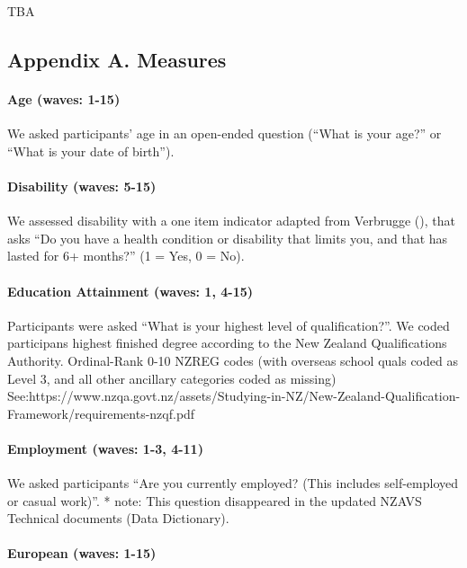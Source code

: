 \documentclass[
  singlecolumn,
  9pt]{article}
\let\oldparagraph\paragraph
\renewcommand{\paragraph}[1]{\oldparagraph{#1}\mbox{}}
\begin{document}
TBA

\newpage{}

\subsection{Appendix A. Measures}\label{appendix-a.-measures}

\paragraph{Age (waves: 1-15)}\label{age-waves-1-15}

We asked participants' age in an open-ended question (``What is your
age?'' or ``What is your date of birth'').

\paragraph{Disability (waves: 5-15)}\label{disability-waves-5-15}

We assessed disability with a one item indicator adapted from Verbrugge
(), that asks ``Do you have a health
condition or disability that limits you, and that has lasted for 6+
months?'' (1 = Yes, 0 = No).

\paragraph{Education Attainment (waves: 1,
4-15)}\label{education-attainment-waves-1-4-15}

Participants were asked ``What is your highest level of
qualification?''. We coded participans highest finished degree according
to the New Zealand Qualifications Authority. Ordinal-Rank 0-10 NZREG
codes (with overseas school quals coded as Level 3, and all other
ancillary categories coded as missing)
See:https://www.nzqa.govt.nz/assets/Studying-in-NZ/New-Zealand-Qualification-Framework/requirements-nzqf.pdf

\paragraph{Employment (waves: 1-3,
4-11)}\label{employment-waves-1-3-4-11}

We asked participants ``Are you currently employed? (This includes
self-employed or casual work)''. * note: This question disappeared in
the updated NZAVS Technical documents (Data Dictionary).

\paragraph{European (waves: 1-15)}\label{european-waves-1-15}
\end{document}
